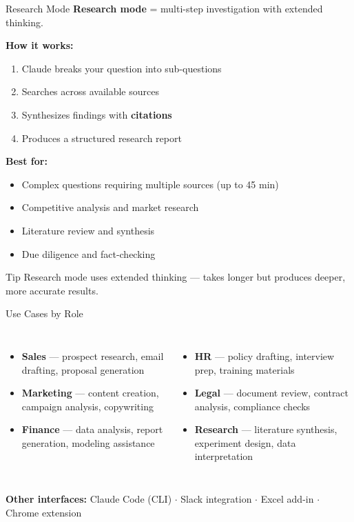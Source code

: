 \documentclass[aspectratio=169]{beamer}
\begin{document}
\begin{frame}{Research Mode}
\textbf{Research mode} = multi-step investigation with extended thinking.

\bigskip
\textbf{How it works:}
\begin{enumerate}
  \item Claude breaks your question into sub-questions
  \item Searches across available sources
  \item Synthesizes findings with \textbf{citations}
  \item Produces a structured research report
\end{enumerate}

\bigskip
\textbf{Best for:}
\begin{itemize}
  \item Complex questions requiring multiple sources (up to 45 min)
  \item Competitive analysis and market research
  \item Literature review and synthesis
  \item Due diligence and fact-checking
\end{itemize}

\begin{alertblock}{Tip}
Research mode uses extended thinking --- takes longer but produces deeper, more accurate results.
\end{alertblock}
\end{frame}

\begin{frame}{Use Cases by Role}
\begin{columns}[T]
\begin{itemize}
  \item \textbf{\color{popblue}Sales} --- prospect research, email drafting, proposal generation
  \item \textbf{\color{paramgreen}Marketing} --- content creation, campaign analysis, copywriting
  \item \textbf{\color{orange1}Finance} --- data analysis, report generation, modeling assistance
\end{itemize}

\begin{itemize}
  \item \textbf{\color{violet1}HR} --- policy drafting, interview prep, training materials
  \item \textbf{\color{warnred}Legal} --- document review, contract analysis, compliance checks
  \item \textbf{\color{sampred}Research} --- literature synthesis, experiment design, data interpretation
\end{itemize}
\end{columns}

\bigskip
\textbf{Other interfaces:}
Claude Code (CLI) $\cdot$ Slack integration $\cdot$ Excel add-in $\cdot$ Chrome extension
\end{frame}
\end{document}
